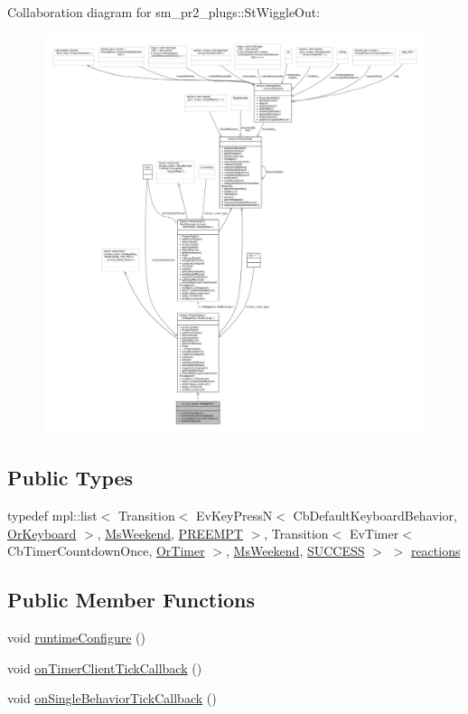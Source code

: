 Collaboration diagram for sm\+\_\+pr2\+\_\+plugs\+:\+:St\+Wiggle\+Out\+:
\nopagebreak
\begin{figure}[H]
\begin{center}
\leavevmode
\includegraphics[width=350pt]{structsm__pr2__plugs_1_1StWiggleOut__coll__graph}
\end{center}
\end{figure}
\subsection*{Public Types}
\begin{DoxyCompactItemize}
\item 
typedef mpl\+::list$<$ Transition$<$ Ev\+Key\+PressN$<$ Cb\+Default\+Keyboard\+Behavior, \hyperlink{classsm__pr2__plugs_1_1OrKeyboard}{Or\+Keyboard} $>$, \hyperlink{classsm__pr2__plugs_1_1MsWeekend}{Ms\+Weekend}, \hyperlink{classPREEMPT}{P\+R\+E\+E\+M\+PT} $>$, Transition$<$ Ev\+Timer$<$ Cb\+Timer\+Countdown\+Once, \hyperlink{classsm__pr2__plugs_1_1OrTimer}{Or\+Timer} $>$, \hyperlink{classsm__pr2__plugs_1_1MsWeekend}{Ms\+Weekend}, \hyperlink{classSUCCESS}{S\+U\+C\+C\+E\+SS} $>$ $>$ \hyperlink{structsm__pr2__plugs_1_1StWiggleOut_a05abb5f452bc304c789a91d0a0d4c80b}{reactions}
\end{DoxyCompactItemize}
\subsection*{Public Member Functions}
\begin{DoxyCompactItemize}
\item 
void \hyperlink{structsm__pr2__plugs_1_1StWiggleOut_a6fa24859d089ed61fcea478ed3b23cce}{runtime\+Configure} ()
\item 
void \hyperlink{structsm__pr2__plugs_1_1StWiggleOut_a5a3ebd3e28a35bbcb63600cb4f5e5265}{on\+Timer\+Client\+Tick\+Callback} ()
\item 
void \hyperlink{structsm__pr2__plugs_1_1StWiggleOut_a569b162bc13388ec2f3812bd538b5cf4}{on\+Single\+Behavior\+Tick\+Callback} ()
\end{DoxyCompactItemize}
